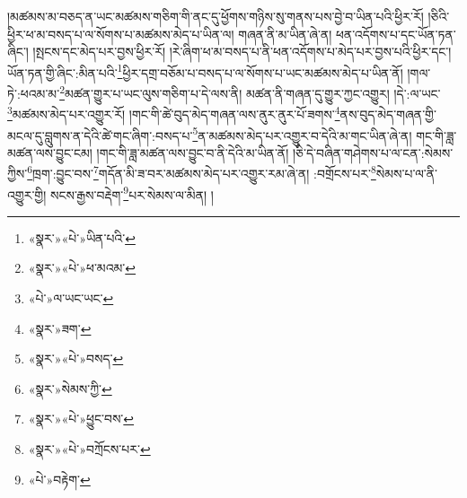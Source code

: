 །མཚམས་མ་བཅད་ན་ཡང་མཚམས་གཅིག་གི་ནང་དུ་ཕྱོགས་གཉིས་སུ་གནས་པས་བྱེ་བ་ཡིན་པའི་ཕྱིར་རོ། །ཅིའི་ཕྱིར་ཕ་མ་བསད་པ་ལ་སོགས་པ་མཚམས་མེད་པ་ཡིན་ལ། གཞན་ནི་མ་ཡིན་ཞེ་ན། ཕན་འདོགས་པ་དང་ཡོན་ཏན་ཞིང་། །སྤངས་དང་མེད་པར་བྱས་ཕྱིར་རོ། །རེ་ཞིག་ཕ་མ་བསད་པ་ནི་ཕན་འདོགས་པ་མེད་པར་བྱས་པའི་ཕྱིར་དང་། ཡོན་ཏན་གྱི་ཞིང་:མིན་པའི་\footnote{«སྣར་»«པེ་»ཡིན་པའི་}ཕྱིར་དགྲ་བཅོམ་པ་བསད་པ་ལ་སོགས་པ་ཡང་མཚམས་མེད་པ་ཡིན་ནོ། །གལ་ཏེ་:ཕའམ་མ་\footnote{«སྣར་»«པེ་»ཕ་མའམ་}མཚན་གྱུར་པ་ཡང་ལུས་གཅིག་པ་དེ་ལས་ནི། མཚན་ནི་གཞན་དུ་གྱུར་ཀྱང་འགྱུར། །དེ་:ལ་ཡང་\footnote{«པེ་»ལ་ཡང་ཡང་}མཚམས་མེད་པར་འགྱུར་རོ། །གང་གི་ཚེ་བུད་མེད་གཞན་ལས་ནུར་ནུར་པོ་ཟགས་\footnote{«སྣར་»ཟག་}ནས་བུད་མེད་གཞན་གྱི་མངལ་དུ་བླུགས་ན་དེའི་ཚེ་གང་ཞིག་:བསད་པ་\footnote{«སྣར་»«པེ་»བསད་}ན་མཚམས་མེད་པར་འགྱུར་བ་དེའི་མ་གང་ཡིན་ཞེ་ན། གང་གི་ཟླ་མཚན་ལས་བྱུང་ངམ། །གང་གི་ཟླ་མཚན་ལས་བྱུང་བ་ནི་དེའི་མ་ཡིན་ནོ། །ཅི་དེ་བཞིན་གཤེགས་པ་ལ་ངན་:སེམས་ཀྱིས་\footnote{«སྣར་»སེམས་ཀྱི་}ཁྲག་:བྱུང་བས་\footnote{«སྣར་»«པེ་»ཕྱུང་བས་}གདོན་མི་ཟ་བར་མཚམས་མེད་པར་འགྱུར་རམ་ཞེ་ན། :བགྲོངས་པར་\footnote{«སྣར་»«པེ་»བཀྲོངས་པར་}སེམས་པ་ལ་ནི་འགྱུར་གྱི། སངས་རྒྱས་བརྡེག་\footnote{«པེ་»བརྟེག་}པར་སེམས་ལ་མིན། །
